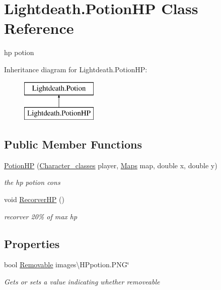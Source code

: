 \hypertarget{class_lightdeath_1_1_potion_h_p}{}\section{Lightdeath.\+Potion\+HP Class Reference}
\label{class_lightdeath_1_1_potion_h_p}


hp potion  


Inheritance diagram for Lightdeath.\+Potion\+HP\+:\begin{figure}[H]
\begin{center}
\leavevmode
\includegraphics[height=2.000000cm]{class_lightdeath_1_1_potion_h_p}
\end{center}
\end{figure}
\subsection*{Public Member Functions}
\begin{DoxyCompactItemize}
\item 
\hyperlink{class_lightdeath_1_1_potion_h_p_ad32fb25b4cb3f3ece63cc5c2e8f0f029}{Potion\+HP} (\hyperlink{class_lightdeath_1_1_character__classes}{Character\+\_\+classes} player, \hyperlink{class_lightdeath_1_1_maps}{Maps} map, double x, double y)
\begin{DoxyCompactList}\small\item\em the hp potion cons \end{DoxyCompactList}\item 
void \hyperlink{class_lightdeath_1_1_potion_h_p_aeaca385f091cc24b6193a9aafed27570}{Recorver\+HP} ()
\begin{DoxyCompactList}\small\item\em recorver 20\% of max hp \end{DoxyCompactList}\end{DoxyCompactItemize}
\subsection*{Properties}
\begin{DoxyCompactItemize}
\item 
bool \hyperlink{class_lightdeath_1_1_potion_h_p_acd0030fe46b32286c305c918d15dcb7e}{Removable} images\textbackslash{}\+H\+Ppotion.\+P\+NG\char`\"{}
\begin{DoxyCompactList}\small\item\em Gets or sets a value indicating whether removeable \end{DoxyCompactList}\end{DoxyCompactItemize}


